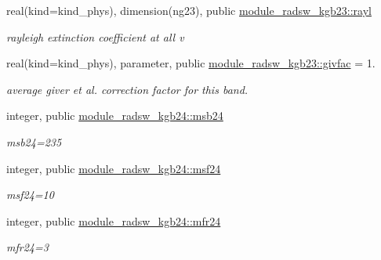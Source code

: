 \begin{DoxyCompactItemize}
\mbox{\label{group__module__radsw__kgbnn_ga40006f284543c7347eced417b9de2fc6}} 
real(kind=kind\+\_\+phys), dimension(ng23), public \hyperlink{group__module__radsw__kgbnn_ga40006f284543c7347eced417b9de2fc6}{module\+\_\+radsw\+\_\+kgb23\+::rayl}
\begin{DoxyCompactList}\small\item\em rayleigh extinction coefficient at all v \end{DoxyCompactList}\item 
\mbox{\label{group__module__radsw__kgbnn_ga5f6ced06169db4b7470e20d5639ac54c}} 
real(kind=kind\+\_\+phys), parameter, public \hyperlink{group__module__radsw__kgbnn_ga5f6ced06169db4b7470e20d5639ac54c}{module\+\_\+radsw\+\_\+kgb23\+::givfac} = 1.
\begin{DoxyCompactList}\small\item\em average giver et al. correction factor for this band. \end{DoxyCompactList}\item 
\mbox{\label{group__module__radsw__kgbnn_ga0ec09b4df9fbfa868844ad93a84cbe31}} 
integer, public \hyperlink{group__module__radsw__kgbnn_ga0ec09b4df9fbfa868844ad93a84cbe31}{module\+\_\+radsw\+\_\+kgb24\+::msb24}
\begin{DoxyCompactList}\small\item\em msb24=235 \end{DoxyCompactList}\item 
\mbox{\label{group__module__radsw__kgbnn_ga52d0fde0af1d5427acf0d1924f393cdc}} 
integer, public \hyperlink{group__module__radsw__kgbnn_ga52d0fde0af1d5427acf0d1924f393cdc}{module\+\_\+radsw\+\_\+kgb24\+::msf24}
\begin{DoxyCompactList}\small\item\em msf24=10 \end{DoxyCompactList}\item 
\mbox{\label{group__module__radsw__kgbnn_ga3a1c3808493ce89f2218116a02350e51}} 
integer, public \hyperlink{group__module__radsw__kgbnn_ga3a1c3808493ce89f2218116a02350e51}{module\+\_\+radsw\+\_\+kgb24\+::mfr24}
\begin{DoxyCompactList}\small\item\em mfr24=3 \end{DoxyCompactList}\item 

\end{DoxyCompactItemize}
